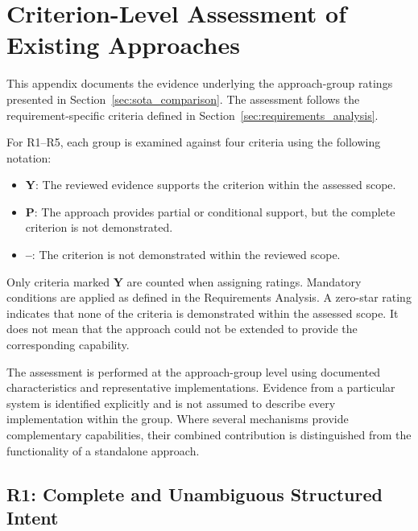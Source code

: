 
\chapter{Criterion-Level Assessment of Existing Approaches}
\label{app:requirement_assessment}

This appendix documents the evidence underlying the
approach-group ratings presented in
Section~\ref{sec:sota_comparison}. The assessment
follows the requirement-specific criteria defined in
Section~\ref{sec:requirements_analysis}.

For R1--R5, each group is examined against four
criteria using the following notation:

\begin{itemize}
    \item \textbf{Y}: The reviewed evidence supports
    the criterion within the assessed scope.

    \item \textbf{P}: The approach provides partial or
    conditional support, but the complete criterion
    is not demonstrated.

    \item \textbf{--}: The criterion is not demonstrated
    within the reviewed scope.
\end{itemize}

Only criteria marked \textbf{Y} are counted when
assigning ratings. Mandatory conditions are applied
as defined in the Requirements Analysis. A zero-star
rating indicates that none of the criteria is
demonstrated within the assessed scope. It does not
mean that the approach could not be extended to
provide the corresponding capability.

The assessment is performed at the approach-group
level using documented characteristics and
representative implementations. Evidence from a
particular system is identified explicitly and
is not assumed to describe every implementation
within the group. Where several mechanisms provide
complementary capabilities, their combined contribution
is distinguished from the functionality of a
standalone approach.


\section{R1: Complete and Unambiguous Structured Intent}

